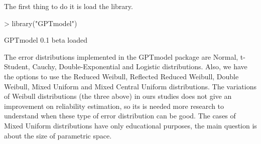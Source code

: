\documentclass[nogin,letterpaper,12pt]{article}
\begin{document}
The first thing to do it is load the library.
\begin{Schunk}
\begin{Sinput}
> library("GPTmodel")
\end{Sinput}
\begin{Soutput}
GPTmodel 0.1 beta loaded
\end{Soutput}
\end{Schunk}

The error distributions implemented in the GPTmodel package are Normal, t-Student, Cauchy, Double-Exponential and Logistic distributions. Also, we have the options to use the Reduced Weibull, Reflected Reduced Weibull, Double Weibull, Mixed Uniform and Mixed Central Uniform distributions. The variations of Weibull distributions (the three above) in ours studies does not give an improvement on reliability estimation, so its is needed more research to understand when these type of error distribution can be good. The cases of Mixed Uniform distributions have only educational purposes, the main question is about the size of parametric space.
\end{document}
